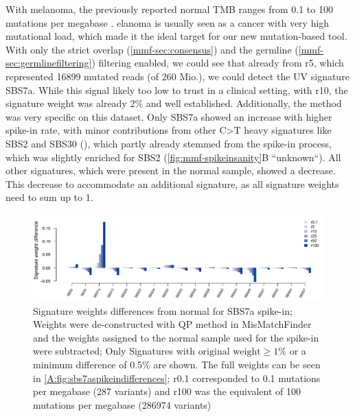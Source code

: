 With melanoma, the previously reported normal TMB ranges from 0.1 to 100 mutations per megabase \cite{Alexandrov2020}. elanoma is usually seen as a cancer with  very high mutational load, which made it the ideal target for our new mutation-based tool. With only the strict overlap (\autoref{mmf-sec:consensus}) and the germline (\autoref{mmf-sec:germlinefiltering}) filtering enabled, we could see that already from r5, which represented 16899 mutated reads (of 260 Mio.), we could detect the UV signature SBS7a. While this signal  likely too low to trust in a clinical setting, with r10, the signature weight was already 2\% and well established. Additionally, the method was very specific on this dataset. Only SBS7a showed an increase with  higher spike-in rate, with minor contributions from other C>T heavy signatures like SBS2 and SBS30 (), which partly already stemmed from the spike-in process, which was slightly enriched for SBS2 (\autoref{fig:mmf-spikeinsanity}B ``unknown``). All other signatures, which were present in the normal sample, showed a decrease. This decrease  to accommodate an additional signature, as all signature weights need to sum up to 1.


\begin{figure}[ht]
\centering
\includegraphics[width=.99\linewidth]{Figures/MisMatchFinder/SBS7SpikeInSignatureDifferencesFocussed.pdf}
\caption[Signature weights differences from normal for SBS7a spike-in]{Signature weights differences from normal for SBS7a spike-in; Weights were de-constructed with QP method in MisMatchFinder and the weights assigned to the normal sample used for the spike-in were subtracted; Only Signatures with $\text{original weight}\geq 1\%$ or a minimum difference of 0.5\% are shown. The full weights can be seen in \protect\autoref{A:fig:sbs7aspikeindifferences}; r0.1 corresponded to 0.1 mutations per megabase (287 variants) and r100 was the equivalent of 100 mutations per megabase (286974 variants)}\label{fig:mmf-spikeSBS7asignatures}
\end{figure}

